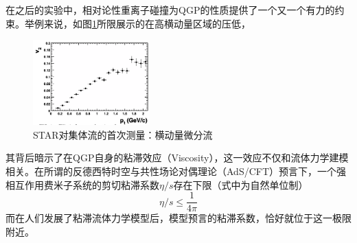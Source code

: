 \documentclass[%
 reprint,
 amsmath,amssymb,
 aps,
]{revtex4-1}
\begin{document}
在之后的实验中，相对论性重离子碰撞为QGP的性质提供了一个又一个有力的约束。举例来说，如图\ref{fig:v2pt}\cite{Ackermann:2000tr}所限展示的在高横动量区域的压低，
\begin{figure}[htbp]
    \includegraphics[width=0.4\textwidth]{Plots/v2pt.png}
    \caption{\label{fig:v2pt}STAR对集体流的首次测量：横动量微分流}
\end{figure}
其背后暗示了在QGP自身的粘滞效应（Viscosity），这一效应不仅和流体力学建模相关。在所谓的反德西特时空与共性场论对偶理论（AdS/CFT）预言下，一个强相互作用费米子系统的剪切粘滞系数$\eta/s$存在下限（式中为自然单位制）
\begin{equation}
    \eta/s \leq \frac{1}{4\pi}
\end{equation}
而在人们发展了粘滞流体力学模型后，模型预言的粘滞系数，恰好就位于这一极限附近。
\end{document}
